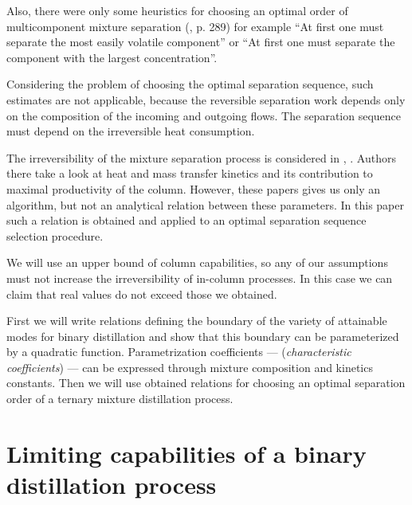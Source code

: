 \documentclass[12pt]{article}
\begin{document}
  Also, there were only some heuristics for choosing an optimal order of multicomponent mixture separation (\cite{Kafar}, p. 289) for example ``At first one must separate the most easily volatile component'' or ``At first one must separate the component with the largest concentration''. 
  
  Considering the problem of choosing the optimal separation sequence, such estimates are not applicable, because the reversible separation work depends only on the composition of the incoming and outgoing flows. The separation sequence must depend on the irreversible heat consumption.     

     The irreversibility of the mixture separation process is considered in \cite{Berry}, \cite{TsGrig}. Authors there take a look at heat and mass transfer kinetics and its contribution to maximal productivity of the column. However, these papers gives us only an algorithm, but not an analytical relation between these parameters. In this paper such a relation is obtained and applied to an optimal separation sequence selection procedure.
     
     We will use an upper bound of column capabilities, so any of our assumptions must not increase the irreversibility of in-column processes. In this case we can claim that real values do not exceed those we obtained.
     
     First we will write relations defining the boundary of the variety of attainable modes for binary distillation and show that this boundary can be parameterized by a quadratic function. Parametrization coefficients --- (\textit{characteristic coefficients}) --- can be expressed through mixture composition and kinetics constants. Then we will use obtained relations for choosing an optimal separation order of a ternary mixture distillation process.

\section{Limiting capabilities of a binary distillation process}
\end{document}
